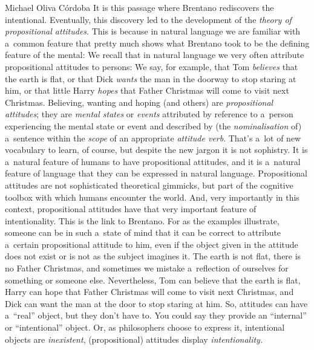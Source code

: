 \begin{artengenv}{Michael Oliva Córdoba}
\noindent It is this passage where Brentano rediscovers the intentional. Eventually, this discovery led to the development of the \textit{theory of propositional attitudes}. This is because in natural language we are familiar with a~common feature that pretty much shows what Brentano took to be the defining feature of the mental: We recall that in natural language we very often attribute propositional attitudes to persons: We say, for example, that Tom \textit{believes} that the earth is flat, or that Dick \textit{wants} the man in the doorway to stop staring at him, or that little Harry \textit{hopes} that Father Christmas will come to visit next Christmas. Believing, wanting and hoping (and others) are \textit{propositional attitudes}; they are \textit{mental states} or \textit{events} attributed by reference to a~person experiencing the mental state or event and described by (the \textit{nominalisation} of) a~sentence within the \textit{scope} of an appropriate \textit{attitude verb}. That's a~lot of new vocabulary to learn, of course, but despite the new jargon it is not sophistry. It is a~natural feature of humans to have propositional attitudes, and it is a~natural feature of language that they can be expressed in natural language. Propositional attitudes are not sophisticated theoretical gimmicks, but part of the cognitive toolbox with which humans encounter the world. And, very importantly in this context, propositional attitudes have that very important feature of intentionality. This is the link to Brentano. For as the examples illustrate, someone can be in such a~state of mind that it can be correct to attribute a~certain propositional attitude to him, even if the object given in the attitude does not exist or is not as the subject imagines it. The earth is not flat, there is no Father Christmas, and sometimes we mistake a~reflection of ourselves for something or someone else. Nevertheless, Tom can believe that the earth is flat, Harry can hope that Father Christmas will come to visit next Christmas, and Dick can want the man at the door to stop staring at him. So, attitudes can have a~``real'' object, but they don't have to. You could say they provide an ``internal'' or ``intentional'' object. Or, as philosophers choose to express it, intentional objects are \textit{inexistent}, (propositional) attitudes display \textit{intentionality.}






\end{artengenv}
